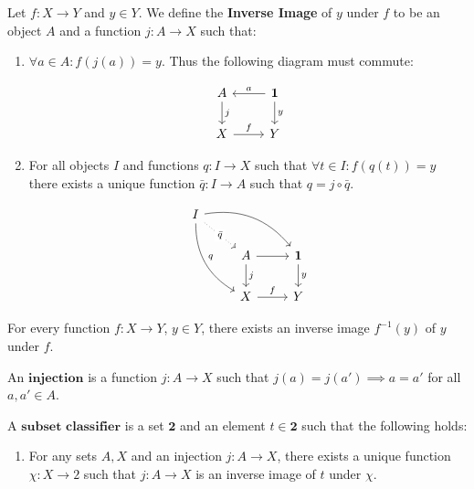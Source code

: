 \begin{definition}[$\dagger$]
Let $f: X \longrightarrow Y$ and $y \in Y$. We define the \textbf{Inverse Image} of $y$ under $f$ to be an object $A$ and a function $j:A \longrightarrow X$ such that:
\begin{enumerate}
\item $\forall a \in A: f(j(a)) = y$. Thus the following diagram must commute:

\begin{equation*}
\begin{tikzcd}
A \arrow[d, "j"]
& \mathbf{1} \arrow[d, "y"] \arrow[l, "a", swap] \\
 X \arrow[r, "f"]
& Y
\end{tikzcd}
\end{equation*}

\item For all objects $I$ and functions $q: I \longrightarrow X$ such that $\forall t \in I: f(q(t)) = y$ there exists a unique function $\bar{q}: I \longrightarrow A$ such that $q = j \circ \bar{q}$.

\begin{equation*}
\begin{tikzcd}
I 
\arrow[drr, bend left]
\arrow[ddr, bend right, "q"]
\arrow[dr, dotted, "{\bar{q}}" description] & & \\
& A \arrow[d, "j"] \arrow[r, ""]
& \mathbf{1} \arrow[d, "y"]  \\
& X \arrow[r, "f"]
& Y
\end{tikzcd}
\end{equation*}


\end{enumerate}
\end{definition}

\begin{axiom}
For every function $f: X \longrightarrow Y$, $y \in Y$, there exists an inverse image $f^{-1}(y)$ of $y$ under $f$.
\end{axiom}

\begin{definition}[$\dagger$]
An $\textbf{injection}$ is a function $j:A \longrightarrow X$ such that $j(a) = j(a') \implies a = a'$ for all $a,a' \in A$.
\end{definition}

\begin{definition}
A $\textbf{subset classifier}$ is a set $\mathbf{2}$ and an element $t \in \mathbf{2}$ such that the following holds:
\begin{enumerate}
\item For any sets $A,X$ and an injection $j: A \longrightarrow X$, there exists a unique function $\chi: X \longrightarrow 2$ such that $j: A \longrightarrow X$ is an inverse image of $t$ under $\chi$.
\end{enumerate}

\end{definition}

